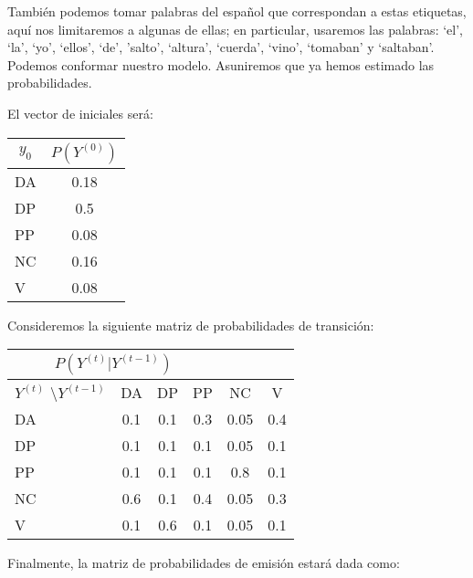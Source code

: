 También podemos tomar palabras del español que correspondan a estas etiquetas, aquí nos limitaremos a algunas de ellas; en particular, usaremos las palabras: `el', `la', `yo', `ellos', `de', 'salto', `altura', `cuerda', `vino', `tomaban' y `saltaban'. Podemos conformar nuestro modelo. Asuniremos que ya hemos estimado las probabilidades.

El vector de iniciales será:

\begin{center}
 \begin{tabular}{l|c}
  \multicolumn{1}{c|}{$y_0$}   &  $P(Y^{(0)})$ \\ \hline
  DA &    0.18 \\
  DP   &    0.5 \\
  PP    &    0.08 \\
  NC & 0.16 \\
  V &  0.08 \\
 \end{tabular}
 \end{center}

 Consideremos la siguiente matriz de probabilidades de transición:

 \begin{center}
 \begin{tabular}{l|ccccc}
  \multicolumn{4}{c}{$P(Y^{(t)}|Y^{(t-1)})$} \\ \hline
  $Y^{(t)}$ \textbackslash $Y^{(t-1)}$          & DA & DP & PP & NC & V \\ \hline
  DA & 0.1  & 0.1  & 0.3 & 0.05 & 0.4 \\
  DP & 0.1  & 0.1  & 0.1 & 0.05 & 0.1 \\
  PP & 0.1  & 0.1  & 0.1 & 0.8  & 0.1 \\
  NC & 0.6  & 0.1  & 0.4 & 0.05 & 0.3 \\
  V  & 0.1  & 0.6  & 0.1 & 0.05 & 0.1 \\
 \end{tabular}
 \end{center}


 Finalmente, la matriz de probabilidades de emisión estará dada como:

